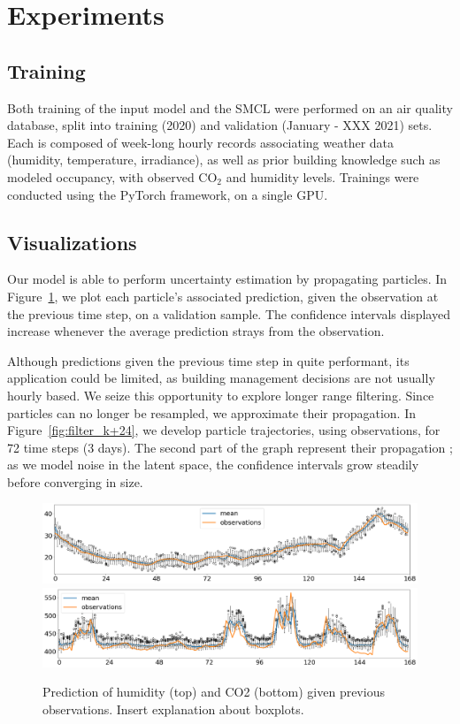 \documentclass{article}
\begin{document}
\section{Experiments}
\label{sec:exp}

\subsection{Training}%
\label{sub:training}
Both training of the input model and the SMCL were performed on an air quality database, split into training (2020) and validation (January - XXX 2021) sets.
Each is composed of week-long hourly records associating weather data (humidity, temperature, irradiance), as well as prior building knowledge such as modeled occupancy, with observed \ensuremath{\mathrm{CO_2}} and humidity levels.
Trainings were conducted using the PyTorch framework, on a single GPU.

\subsection{Visualizations}%
\label{sub:visualizations}
Our model is able to perform uncertainty estimation by propagating particles.
In Figure~\ref{fig:filter_k+1}, we plot each particle's associated prediction, given the observation at the previous time step, on a validation sample.
The confidence intervals displayed increase whenever the average prediction strays from the observation.

Although predictions given the previous time step in quite performant, its application could be limited, as building management decisions are not usually hourly based.
We seize this opportunity to explore longer range filtering.
Since particles can no longer be resampled, we approximate their propagation.
In Figure~\ref{fig:filter_k+24}, we develop particle trajectories, using observations, for 72 time steps (3 days).
The second part of the graph represent their propagation ; as we model noise in the latent space, the confidence intervals grow steadily before converging in size.

\begin{figure}[htpb]
	\centering
	\includegraphics[width=\linewidth]{filter_kp1_hum.png}
	\includegraphics[width=\linewidth]{filter_kp1_co2.png}
	\caption{Prediction of humidity (top) and CO2 (bottom) given previous observations. Insert explanation about boxplots.}%
	\label{fig:filter_k+1}
\end{figure}
\end{document}
